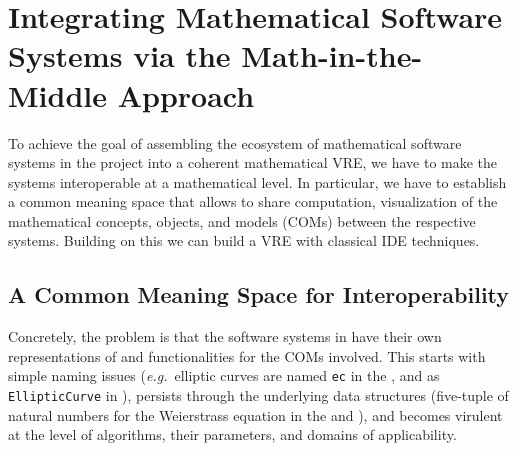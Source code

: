 \section{Integrating Mathematical Software Systems via the Math-in-the-Middle Approach}



To achieve the goal of assembling the ecosystem of mathematical software systems in the
\ODK project into a coherent mathematical VRE, we have to make the systems interoperable at
a mathematical level. In particular, we have to establish a common meaning space that
allows to share computation, visualization of the mathematical concepts, objects, and
models (COMs) between the respective systems. Building on this we can build a VRE with
classical IDE techniques. 

\subsection{A Common Meaning Space for Interoperability}
Concretely, the problem is that the software systems in \ODK have their own representations
of and functionalities for the COMs involved. This starts with simple naming issues (\emph{e.g.}\
elliptic curves are named \lstinline|ec| in the \LMFDB, and as \lstinline|EllipticCurve|
in \Sage), persists through the underlying data structures (five-tuple of natural
numbers for the Weierstrass equation in the \LMFDB and ), and becomes virulent at the level of
algorithms, their parameters, and domains of applicability.

